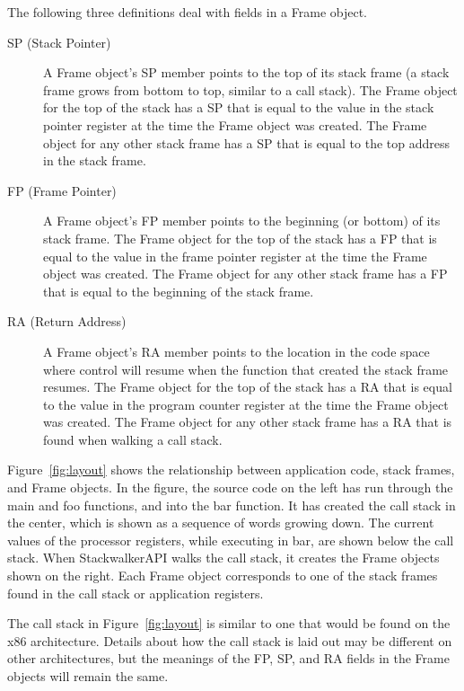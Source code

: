 The following three definitions deal with fields in a Frame object. 
\begin{description}

\item [SP (Stack Pointer)] A Frame object's SP member points to the top of its
    stack frame (a stack frame grows from bottom to top, similar to a call
    stack). The Frame object for the top of the stack has a SP that is equal to
    the value in the stack pointer register at the time the Frame object was
    created. The Frame object for any other stack frame has a SP that is equal
    to the top address in the stack frame. 

\item [FP (Frame Pointer)] A Frame object's FP member points to the beginning
    (or bottom) of its stack frame. The Frame object for the top of the stack
    has a FP that is equal to the value in the frame pointer register at the
    time the Frame object was created. The Frame object for any other stack
    frame has a FP that is equal to the beginning of the stack frame.
    
\item [RA (Return Address)] A Frame object's RA member points to the location in
    the code space where control will resume when the function that created the
    stack frame resumes. The Frame object for the top of the stack has a RA that
    is equal to the value in the program counter register at the time the Frame
    object was created.  The Frame object for any other stack frame has a RA
    that is found when walking a call stack.

\end{description}



Figure~\ref{fig:layout} shows the relationship between application code, stack
frames, and Frame objects. In the figure, the source code on the left has run
through the main and foo functions, and into the bar function. It has created
the call stack in the center, which is shown as a sequence of words growing
down. The current values of the processor registers, while executing in bar, are
shown below the call stack. When StackwalkerAPI walks the call stack, it creates
the Frame objects shown on the right. Each Frame object corresponds to one of
the stack frames found in the call stack or application registers.  

The call stack in Figure~\ref{fig:layout} is similar to one that would be found
on the x86 architecture. Details about how the call stack is laid out may be
different on other architectures, but the meanings of the FP, SP, and RA fields
in the Frame objects will remain the same. 

